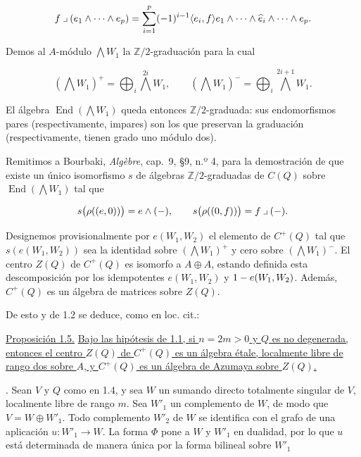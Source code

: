 \begin{equation*}
f\mathbin{\lrcorner}(e_1\wedge\cdots\wedge e_p)
=\sum_{i=1}^{p}(-1)^{\sisi{i}{i-1}}\langle e_i,f\rangle
\sisi{e_0}{e_1}\wedge\cdots\wedge\widehat e_i\wedge\cdots\wedge e_p.
\end{equation*}


Demos al $A$-módulo $\bigwedge W_1$ la $\mathbb Z/2$-graduación para la
cual

\pageoriginale

\begin{equation*}
(\bigwedge W_1)^+=\bigoplus_i\bigwedge^{2i}W_1,
\qquad
(\bigwedge W_1)^-=\bigoplus_i\bigwedge^{2i+1}W_1.
\end{equation*}

El álgebra $\operatorname{End}(\bigwedge W_1)$ queda entonces
$\mathbb Z/2$-graduada: sus endomorfismos pares (respectivamente, impares)
son los que preservan la graduación (respectivamente, tienen grado uno
módulo dos).

Remitimos a Bourbaki, \emph{Algèbre}, cap.~9, §9, n.º 4, para la
demostración de que existe un único isomorfismo $s$ de álgebras
$\mathbb Z/2$-graduadas de $C(Q)$ sobre
$\operatorname{End}(\bigwedge W_1)$ tal que

\begin{equation*}
s\bigl(\rho((e,0))\sisi{\bigr.}{\bigr)}=e\wedge(-),
\qquad
s\bigl(\rho((0,f))\sisi{\bigr.}{\bigr)}=f\mathbin{\lrcorner}(-).
\end{equation*}

Designemos provisionalmente por $e(W_1,W_2)$ el elemento de $C^+(Q)$ tal
que $s(e(W_1,W_2))$ sea la identidad sobre $(\bigwedge W_1)^+$ y cero
sobre $(\bigwedge W_1)^-$. El centro $Z(Q)$ de $C^+(Q)$ es isomorfo a
$A\oplus A$, estando definida esta descomposición por los idempotentes
$e(W_1,W_2)$ y $1-e(\sisi{W_2,W_1}{W_1,W_2})$. Además, $C^+(Q)$ es un álgebra de matrices
sobre $Z(Q)$.

De esto y de 1.2 se deduce, como en loc. cit.:

\medskip
\noindent\underline{Proposición 1.5.}\quad
\underline{Bajo las hipótesis de 1.1, si $n=2m>0$ y $Q$ es no degenerada,
entonces el centro $Z(Q)$ de $C^+(Q)$ es un álgebra étale, localmente libre
de rango dos sobre $A$, y $C^+(Q)$ es un álgebra de Azumaya sobre $Z(Q)$.}

\medskip
{}. Sean $V$ y $Q$ como en 1.4, y sea $W$ un sumando directo
totalmente singular de $V$, localmente libre de rango $m$. Sea $W'_1$ un
complemento de $W$, de modo que $V=W\oplus W'_1$. Todo complemento $W'_2$
de $W$ se identifica con el grafo de una aplicación $u:W'_1\to W$. La
forma $\Phi$ pone a $W$ y $W'_1$ en dualidad, por lo que $u$ está
determinada de manera única por la forma bilineal sobre $W'_1$

